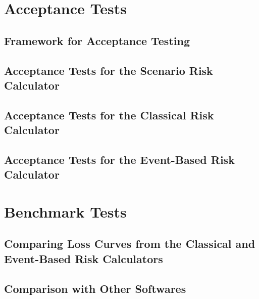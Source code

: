 \documentclass[11pt,fleqn]{book} %
\begin{document}
\thispagestyle{empty}
\part{Acceptance Tests}

\chapter{Framework for Acceptance Testing}
   \label{chap:acc-framework}
   
   \cleardoublepage
\chapter{Acceptance Tests for the Scenario Risk Calculator}
   \label{chap:acc-scenario}
   
   \cleardoublepage
\chapter{Acceptance Tests for the Classical Risk Calculator}
   \label{chap:acc-classical}
   
   \cleardoublepage
\chapter{Acceptance Tests for the Event-Based Risk Calculator}
   \label{chap:acc-eventbased}
   
   \cleardoublepage

\thispagestyle{empty}
\part{Benchmark Tests}

\chapter{Comparing Loss Curves from the Classical and Event-Based Risk Calculators}
   \label{chap:bm-classical-eventbased}
   
   \cleardoublepage

\chapter{Comparison with Other Softwares}
   \label{chap:bm-comparison}
   
   \cleardoublepage
\end{document}

